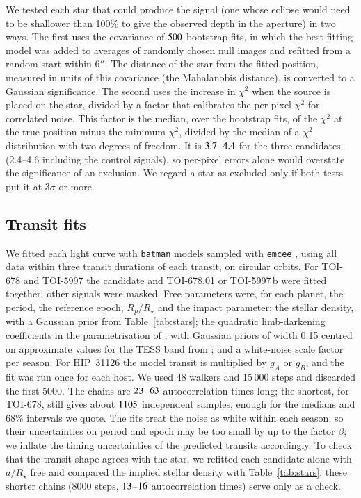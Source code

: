 \documentclass[twocolumn,numberedappendix,appendixfloats]{openjournal}
\begin{document}
We tested each star that could produce the signal (one whose eclipse would
need to be shallower than 100\% to give the observed depth in the aperture)
in two ways. The first uses the covariance of $500$ bootstrap fits, in
which the best-fitting model was added to averages of randomly chosen null
images and refitted from a random start within $6''$. The distance of the
star from the fitted position, measured in units of this covariance (the
Mahalanobis distance), is converted to a Gaussian significance. The second uses the increase in $\chi^2$
when the source is placed on the star, divided by a factor that calibrates the
per-pixel $\chi^2$ for correlated noise. This factor is the median, over the
bootstrap fits, of the $\chi^2$ at the true position minus the minimum $\chi^2$,
divided by the median of a $\chi^2$ distribution with two degrees of freedom.
It is $3.7$--$4.4$ for the three candidates (2.4--4.6
including the control signals), so per-pixel errors alone would overstate the
significance of an exclusion.
We regard a star as excluded only if both tests put it at $3\sigma$ or more.

\subsection{Transit fits}
\label{sec:fit}

We fitted each light curve with \texttt{batman} \citep{kreidberg2015} models
sampled with \texttt{emcee} \citep{foremanmackey2013}, using all data within
three transit durations of each transit, on circular orbits. For TOI-678 and
TOI-5997 the candidate and TOI-678.01 or TOI-5997\,b were fitted together; other
signals were masked. Free parameters were, for each planet, the period, the
reference epoch, $R_p/R_\star$ and the impact parameter; the stellar density,
with a Gaussian prior from Table~\ref{tab:stars}; the quadratic limb-darkening
coefficients in the parametrisation of \citet{kipping2013}, with Gaussian priors
of width 0.15 centred on approximate values for the TESS band from
\citet{claret2017}; and a white-noise scale factor per season. For HIP~31126
the model transit is multiplied by $g_A$ or $g_B$, and the fit was run once
for each host. We used
48 walkers and 15\,000 steps and discarded the first 5000. The chains are
$23$--$63$ autocorrelation times long; the shortest, for TOI-678,
still gives about $1105$ independent samples, enough for the medians and
68\% intervals we quote. The fits treat the noise as white within each season,
so their uncertainties on period and epoch may be too small by up to the factor
$\beta$; we inflate the timing uncertainties of the predicted transits
accordingly. To check that the transit shape agrees with the star, we refitted
each candidate alone with $a/R_\star$ free and compared the implied stellar
density with Table~\ref{tab:stars}; these shorter chains (8000 steps,
$13$--$16$ autocorrelation times) serve only as a check.
\end{document}
